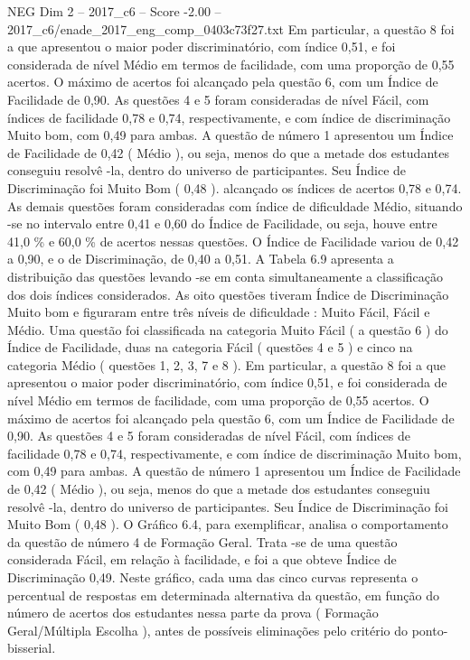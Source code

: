 \begin{textsample}{NEG Dim 2 – 2017\_c6 – Score -2.00 – 2017\_c6/enade\_2017\_eng\_comp\_0403c73f27.txt}
Em particular, a questão 8 foi a que apresentou o maior poder discriminatório, com índice 0,51, e foi considerada de nível Médio em termos de facilidade, com uma proporção de 0,55 acertos.
O máximo de acertos foi alcançado pela questão 6, com um Índice de Facilidade de 0,90.
As questões 4 e 5 foram consideradas de nível Fácil, com índices de facilidade 0,78 e 0,74, respectivamente, e com índice de discriminação Muito bom, com 0,49 para ambas.
A questão de número 1 apresentou um Índice de Facilidade de 0,42 ( Médio ), ou seja, menos do que a metade dos estudantes conseguiu resolvê -la, dentro do universo de participantes.
Seu Índice de Discriminação foi Muito Bom ( 0,48 ). alcançado os índices de acertos 0,78 e 0,74.
As demais questões foram consideradas com índice de dificuldade Médio, situando -se no intervalo entre 0,41 e 0,60 do Índice de Facilidade, ou seja, houve entre 41,0 \% e 60,0 \% de acertos nessas questões.
O Índice de Facilidade variou de 0,42 a 0,90, e o de Discriminação, de 0,40 a 0,51.
A Tabela 6.9 apresenta a distribuição das questões levando -se em conta simultaneamente a classificação dos dois índices considerados.
As oito questões tiveram Índice de Discriminação Muito bom e figuraram entre três níveis de dificuldade : Muito Fácil, Fácil e Médio.
Uma questão foi classificada na categoria Muito Fácil ( a questão 6 ) do Índice de Facilidade, duas na categoria Fácil ( questões 4 e 5 ) e cinco na categoria Médio ( questões 1, 2, 3, 7 e 8 ).
Em particular, a questão 8 foi a que apresentou o maior poder discriminatório, com índice 0,51, e foi considerada de nível Médio em termos de facilidade, com uma proporção de 0,55 acertos.
O máximo de acertos foi alcançado pela questão 6, com um Índice de Facilidade de 0,90.
As questões 4 e 5 foram consideradas de nível Fácil, com índices de facilidade 0,78 e 0,74, respectivamente, e com índice de discriminação Muito bom, com 0,49 para ambas.
A questão de número 1 apresentou um Índice de Facilidade de 0,42 ( Médio ), ou seja, menos do que a metade dos estudantes conseguiu resolvê -la, dentro do universo de participantes.
Seu Índice de Discriminação foi Muito Bom ( 0,48 ).
O Gráfico 6.4, para exemplificar, analisa o comportamento da questão de número 4 de Formação Geral.
Trata -se de uma questão considerada Fácil, em relação à facilidade, e foi a que obteve Índice de Discriminação 0,49.
Neste gráfico, cada uma das cinco curvas representa o percentual de respostas em determinada alternativa da questão, em função do número de acertos dos estudantes nessa parte da prova ( Formação Geral/Múltipla Escolha ), antes de possíveis eliminações pelo critério do ponto-bisserial.

\end{textsample}
